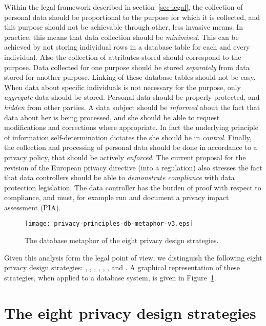 Within the legal framework described in section~\ref{sec-legal}, the collection of personal data should be proportional to the purpose for which it is collected, and this purpose should not be achievable through other, less invasive means. In practice, this means that data collection should be \emph{minimised}. This can be achieved by not storing individual rows in a database table for each and every individual. Also the collection of attributes stored should correspond to the purpose. Data collected for one purpose should be stored \emph{separately} from data stored for another purpose. Linking of these database tables should not be easy. When data about specific individuals is not necessary for the purpose, only \emph{aggregate} data should be stored. Personal data should be properly protected, and \emph{hidden} from other parties. A data subject should be \emph{informed} about the fact that data about her is being processed, and she should be able to request modifications and corrections where appropriate. In fact the underlying principle of information self-determination dictates the she should be in \emph{control}. Finally, the collection and processing of personal data should be done in accordance to a privacy policy, that should be actively \emph{enforced}. The current proposal for the revision of the European privacy directive (into a regulation) also stresses the fact that data controllers should be able to \emph{demonstrate compliance} with data protection legislation. The data controller has the burden of proof with respect to compliance, and must, for example run and document a privacy impact assessment (PIA).


\begin{figure}[t]
\begin{center}
\texttt{[image: privacy-principles-db-metaphor-v3.eps]}
\end{center}
\caption{The database metaphor of the eight privacy design strategies.} 
\label{fig-db-metaphor}
\end{figure}

Given this analysis form the legal point of view, we distinguish the following eight privacy design strategies: , , , , , ,  and . A graphical representation of these strategies, when applied to a database system, is given in Figure~\ref{fig-db-metaphor}. 

\section{The eight privacy design strategies}
\label{sec-pds}

